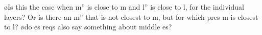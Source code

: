 %
%
%
%


%
%




\toHere

\bl
\o Is this the case when m'' is close to m and l'' is close to l, for the individual layers? Or is there an m'' that is not closest to m, but for which pres m is closest to l?
\o do es reqs also say something about middle es?
\el



